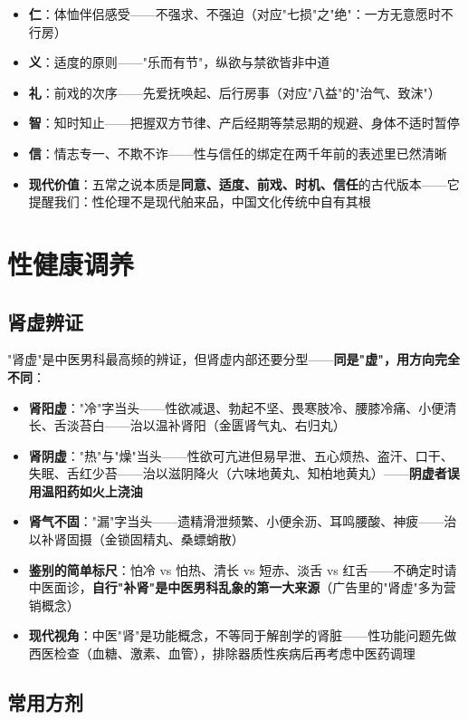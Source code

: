 \begin{itemize}
	\item \textbf{仁}：体恤伴侣感受——不强求、不强迫（对应"七损"之"绝"：一方无意愿时不行房）
	\item \textbf{义}：适度的原则——"乐而有节"，纵欲与禁欲皆非中道
	\item \textbf{礼}：前戏的次序——先爱抚唤起、后行房事（对应"八益"的"治气、致沫"）
	\item \textbf{智}：知时知止——把握双方节律、产后经期等禁忌期的规避、身体不适时暂停
	\item \textbf{信}：情志专一、不欺不诈——性与信任的绑定在两千年前的表述里已然清晰
	\item \textbf{现代价值}：五常之说本质是\textbf{同意、适度、前戏、时机、信任}的古代版本——它提醒我们：性伦理不是现代舶来品，中国文化传统中自有其根
\end{itemize}


\section{性健康调养}
\subsection{肾虚辨证}


"肾虚"是中医男科最高频的辨证，但肾虚内部还要分型——\textbf{同是"虚"，用方向完全不同}：

\begin{itemize}
	\item \textbf{肾阳虚}："冷"字当头——性欲减退、勃起不坚、畏寒肢冷、腰膝冷痛、小便清长、舌淡苔白——治以温补肾阳（金匮肾气丸、右归丸）
	\item \textbf{肾阴虚}："热"与"燥"当头——性欲可亢进但易早泄、五心烦热、盗汗、口干、失眠、舌红少苔——治以滋阴降火（六味地黄丸、知柏地黄丸）——\textbf{阴虚者误用温阳药如火上浇油}
	\item \textbf{肾气不固}："漏"字当头——遗精滑泄频繁、小便余沥、耳鸣腰酸、神疲——治以补肾固摄（金锁固精丸、桑螵蛸散）
	\item \textbf{鉴别的简单标尺}：怕冷 vs 怕热、清长 vs 短赤、淡舌 vs 红舌——不确定时请中医面诊，\textbf{自行"补肾"是中医男科乱象的第一大来源}（广告里的"肾虚"多为营销概念）
	\item \textbf{现代视角}：中医"肾"是功能概念，不等同于解剖学的肾脏——性功能问题先做西医检查（血糖、激素、血管），排除器质性疾病后再考虑中医药调理
\end{itemize}

\subsection{常用方剂}


